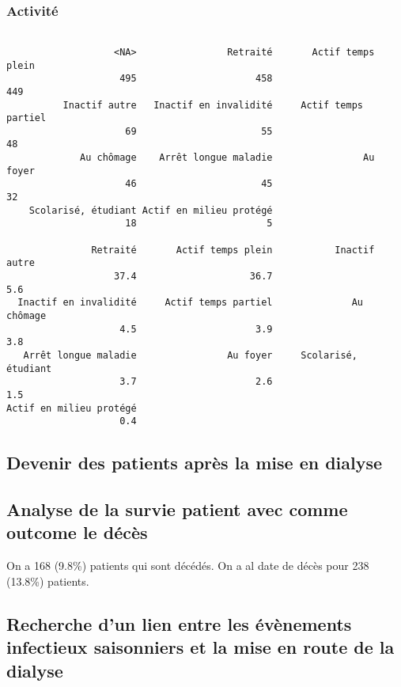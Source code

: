\documentclass[11pt,a4paper]{article}\usepackage[]{graphicx}\usepackage[]{color}
\makeatletter
\newenvironment{kframe}{%
 \def\at@end@of@kframe{}%
 \ifinner\ifhmode%
  \def\at@end@of@kframe{\end{minipage}}%
  \begin{minipage}{\columnwidth}%
 \fi\fi%
 \def\FrameCommand##1{\hskip\@totalleftmargin \hskip-\fboxsep
 \colorbox{shadecolor}{##1}\hskip-\fboxsep
     \hskip-\linewidth \hskip-\@totalleftmargin \hskip\columnwidth}%
 \MakeFramed {\advance\hsize-\width
   \@totalleftmargin\z@ \linewidth\hsize
   \@setminipage}}%
 {\par\unskip\endMakeFramed%
 \at@end@of@kframe}
\newenvironment{knitrout}{}{} %
\makeatother
\begin{document}
    \subsubsection{Activité}

\begin{knitrout}
\color{fgcolor}\begin{kframe}
\begin{verbatim}

                   <NA>                Retraité       Actif temps plein 
                    495                     458                     449 
          Inactif autre   Inactif en invalidité     Actif temps partiel 
                     69                      55                      48 
             Au chômage    Arrêt longue maladie                Au foyer 
                     46                      45                      32 
    Scolarisé, étudiant Actif en milieu protégé 
                     18                       5 

               Retraité       Actif temps plein           Inactif autre 
                   37.4                    36.7                     5.6 
  Inactif en invalidité     Actif temps partiel              Au chômage 
                    4.5                     3.9                     3.8 
   Arrêt longue maladie                Au foyer     Scolarisé, étudiant 
                    3.7                     2.6                     1.5 
Actif en milieu protégé 
                    0.4 
\end{verbatim}
\end{kframe}
\end{knitrout}

  \subsection{Devenir des patients après la mise en dialyse}
  
  \subsection{Analyse de la survie patient avec comme outcome le décès}
  
  On a 168 (9.8\%) patients qui sont décédés. On a al date de décès pour 238 (13.8\%) patients.
  
  \subsection{Recherche d’un lien entre les évènements infectieux saisonniers et la mise en route de la dialyse}
  
\end{document}
